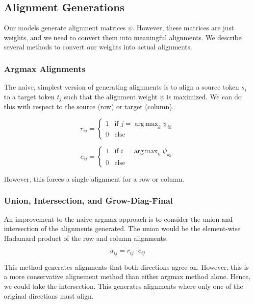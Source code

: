\documentclass[twoside,twocolumn]{article}
\DeclareMathOperator*{\argmax}{arg\,max}
\begin{document}
\subsection{Alignment Generations}
Our models generate alignment matrices $\psi$. However, these matrices are just
weights, and we need to convert them into meaningful alignments. We describe
several methods to convert our weights into actual alignments.

\subsubsection{Argmax Alignments}
The naive, simplest version of generating alignments is to align a source token
$s_i$ to a target token $t_j$ such that the alignment weight $\psi$ is
maximized. We can do this with respect to the source (row) or target (column).

\begin{equation}
  r_{ij} = \begin{cases}
    1 & \text{if } j=\argmax_k \psi_{ik} \\
    0 & \text{else}
  \end{cases}
\end{equation}

\begin{equation}
  c_{ij} = \begin{cases}
    1 & \text{if } i=\argmax_k \psi_{kj} \\
    0 & \text{else}
  \end{cases}
\end{equation}

However, this forces a single alignment for a row or column.

\subsubsection{Union, Intersection, and Grow-Diag-Final}

An improvement to the naive argmax approach is to consider the union and
intersection of the alignments generated. The union would be the element-wise
Hadamard product of the row and column alignments.

\begin{equation}
  u_{ij} = r_{ij} \cdot c_{ij}
\end{equation}

This method generates alignments that both directions agree on. However, this
is a more conservative alignement method than either argmax method alone.
Hence, we could take the intersection. This generates alignments where only one
of the original directions must align.
\end{document}
